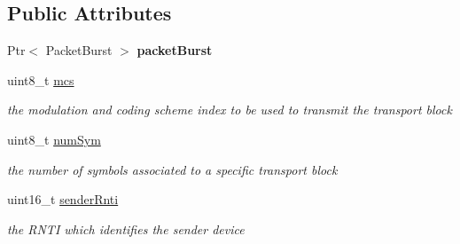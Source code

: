\subsection*{Public Attributes}
\begin{DoxyCompactItemize}
\item 
\mbox{\label{structns3_1_1millicar_1_1MmWaveSidelinkSpectrumSignalParameters_a873326282f3503a6bc088013ef75bced}} 
Ptr$<$ Packet\+Burst $>$ {\bfseries packet\+Burst}
\item 
\mbox{\label{structns3_1_1millicar_1_1MmWaveSidelinkSpectrumSignalParameters_a5b489098e3e18ec32e05f5c50bc303d9}} 
uint8\+\_\+t \hyperlink{structns3_1_1millicar_1_1MmWaveSidelinkSpectrumSignalParameters_a5b489098e3e18ec32e05f5c50bc303d9}{mcs}
\begin{DoxyCompactList}\small\item\em the modulation and coding scheme index to be used to transmit the transport block \end{DoxyCompactList}\item 
\mbox{\label{structns3_1_1millicar_1_1MmWaveSidelinkSpectrumSignalParameters_abef1c09e8c217d564d7ab35c52776b9e}} 
uint8\+\_\+t \hyperlink{structns3_1_1millicar_1_1MmWaveSidelinkSpectrumSignalParameters_abef1c09e8c217d564d7ab35c52776b9e}{num\+Sym}
\begin{DoxyCompactList}\small\item\em the number of symbols associated to a specific transport block \end{DoxyCompactList}\item 
\mbox{\label{structns3_1_1millicar_1_1MmWaveSidelinkSpectrumSignalParameters_a9f94a65733580e8fcec1b0d56c196004}} 
uint16\+\_\+t \hyperlink{structns3_1_1millicar_1_1MmWaveSidelinkSpectrumSignalParameters_a9f94a65733580e8fcec1b0d56c196004}{sender\+Rnti}
\begin{DoxyCompactList}\small\item\em the R\+N\+TI which identifies the sender device \end{DoxyCompactList}\item 
\mbox{\label{structns3_1_1millicar_1_1MmWaveSidelinkSpectrumSignalParameters_ac8ff697cac99b54d01a548783640c242}} 

\end{DoxyCompactItemize}

